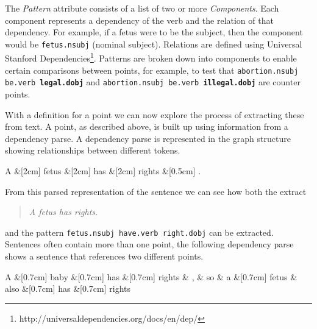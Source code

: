     The \textit{Pattern} attribute consists of a list of two or more \textit{Components}. Each component represents a dependency of the verb and the relation of that dependency. For example, if a fetus were to be the subject, then the component would be \texttt{fetus.nsubj} (nominal subject). Relations are defined using Universal Stanford Dependencies\footnote{http://universaldependencies.org/docs/en/dep/}. Patterns are broken down into components to enable certain comparisons between points, for example, to test that \texttt{abortion.nsubj be.verb \textbf{legal.dobj}} and \texttt{abortion.nsubj be.verb \textbf{illegal.dobj}} are counter points.

    With a definition for a point we can now explore the process of extracting these from text. A point, as described above, is built up using information from a dependency parse. A dependency parse is represented in the graph structure showing relationships between different tokens.

	\begin{center}
      \begin{dependency}[edge horizontal padding=0]
          \begin{deptext}
              A \&[2cm] fetus \&[2cm] has \&[2cm] rights \&[0.5cm] . \\
          \end{deptext}
      \end{dependency}
	\end{center}
    \vspace{-7mm}

    From this parsed representation of the sentence we can see how both the extract \blockquote{\textit{A fetus has rights.}} and the pattern \texttt{fetus.nsubj have.verb right.dobj} can be extracted. Sentences often contain more than one point, the following dependency parse shows a sentence that references two different points.

    \vspace{3mm}
	\begin{dependency}[edge horizontal padding=0]
		\begin{deptext}
			A \&[0.7cm] baby \&[0.7cm] has \&[0.7cm] rights \& , \& so \& a \&[0.7cm] fetus \& also \&[0.7cm] has \&[0.7cm] rights \\
		\end{deptext}


	\end{dependency}
    \vspace{-2mm}

